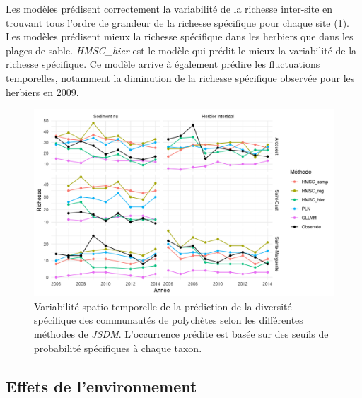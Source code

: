\documentclass[12pt,]{article}
\makeatletter
\def\maxwidth{\ifdim\Gin@nat@width>\linewidth\linewidth
\else\Gin@nat@width\fi}
\let\Oldincludegraphics\includegraphics
\renewcommand{\includegraphics}[1]{\Oldincludegraphics[width=\maxwidth]{#1}}
\makeatother
\begin{document}
Les modèles prédisent correctement la variabilité de la richesse
inter-site en trouvant tous l'ordre de grandeur de la richesse
spécifique pour chaque site (\cref{fig:occpredtemp}). Les modèles
prédisent mieux la richesse spécifique dans les herbiers que dans les
plages de sable. \emph{HMSC\_hier} est le modèle qui prédit le mieux la
variabilité de la richesse spécifique. Ce modèle arrive à également
prédire les fluctuations temporelles, notamment la diminution de la
richesse spécifique observée pour les herbiers en 2009.

\begin{figure}
\hypertarget{fig:occpredtemp}{%
\centering
\includegraphics{figures/roc-richness-prediction-3.png}
\caption{Variabilité spatio-temporelle de la prédiction de la diversité
spécifique des communautés de polychètes selon les différentes méthodes
de \emph{JSDM}. L'occurrence prédite est basée sur des seuils de
probabilité spécifiques à chaque taxon.}\label{fig:occpredtemp}
}
\end{figure}

\hypertarget{effets-de-lenvironnement}{%
\subsection{Effets de l'environnement}\label{effets-de-lenvironnement}}
\end{document}
